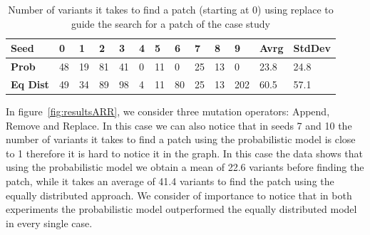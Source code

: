\documentclass[conference]{IEEEtran}
\begin{document}
\begin{table}[ht]
\begin{tabular}{lR{0.1cm}R{0.1cm}R{0.1cm}R{0.1cm}R{0.1cm}R{0.1cm}R{0.1cm}R{0.1cm}R{0.1cm}R{0.1cm}R{0.5cm}R{0.5cm}}
\hline
\textbf{Seed} & \textbf{0} & \textbf{1} & \textbf{2} & \textbf{3} & \textbf{4} & \textbf{5} & \textbf{6} & \textbf{7} & \textbf{8} & \textbf{9} & Avrg & StdDev  \\
\hline
\textbf{Prob} & 48 & 19 & 81 & 41 & 0 & 11 & 0 & 25 & 13 & 0 & 23.8 & 24.8 \\

\textbf{Eq Dist} & 49 & 34 & 89 & 98 & 4 & 11 & 80 & 25 & 13 & 202 & 60.5 & 57.1\\
\hline
\end{tabular}
%
\center
  \caption{Number of variants it takes to find a patch (starting at 0) using replace to guide the search for a patch of the case study}
  \label{fig:resultsReplace}
\end{table} 


In figure~\ref{fig:resultsARR}, we consider three mutation operators: Append, 
Remove and Replace. In this case we can also notice that in seeds 7 and 10 the 
number of variants it takes to find a patch using the probabilistic model is 
close to 1 therefore it is hard to notice it in the graph. In this case the data 
shows that using the probabilistic model we obtain a mean of 22.6 variants 
before finding the patch, while it takes an average of 41.4 variants to find the 
patch using the equally distributed approach. We consider of importance to notice that in both experiments the probabilistic model outperformed the equally distributed model in every single case.
\end{document}
